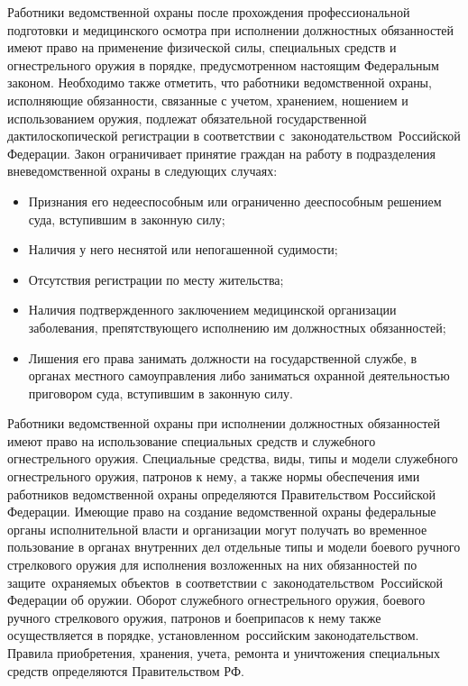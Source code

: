 \documentclass[a4paper,12pt,fleqn]{article} %
\begin{document}
Работники ведомственной охраны после прохождения профессиональной подготовки и медицинского осмотра при исполнении должностных обязанностей имеют право на применение физической силы, специальных средств и огнестрельного оружия в порядке, предусмотренном настоящим Федеральным законом. Необходимо также отметить, что работники ведомственной охраны, исполняющие обязанности, связанные с учетом, хранением, ношением и использованием оружия, подлежат обязательной государственной дактилоскопической регистрации в соответствии с законодательством Российской Федерации. Закон ограничивает принятие граждан на работу в подразделения вневедомственной охраны в следующих случаях:

\begin{itemize}
	\item Признания его недееспособным или ограниченно дееспособным решением суда, вступившим в законную силу;
	\item Наличия у него неснятой или непогашенной судимости;
	\item Отсутствия регистрации по месту жительства;
	\item Наличия подтвержденного заключением медицинской организации заболевания, препятствующего исполнению им должностных обязанностей;
	\item Лишения его права занимать должности на государственной службе, в органах местного самоуправления либо заниматься охранной деятельностью приговором суда, вступившим в законную силу.
\end{itemize}

Работники ведомственной охраны при исполнении должностных обязанностей имеют право на использование специальных средств и служебного огнестрельного оружия. Специальные средства, виды, типы и модели служебного огнестрельного оружия, патронов к нему, а также нормы обеспечения ими работников ведомственной охраны определяются Правительством Российской Федерации. Имеющие право на создание ведомственной охраны федеральные органы исполнительной власти и организации могут получать во временное пользование в органах внутренних дел отдельные типы и модели боевого ручного стрелкового оружия для исполнения возложенных на них обязанностей по защите охраняемых объектов в соответствии с законодательством Российской Федерации об оружии. Оборот служебного огнестрельного оружия, боевого ручного стрелкового оружия, патронов и боеприпасов к нему также осуществляется в порядке, установленном российским законодательством. Правила приобретения, хранения, учета, ремонта и уничтожения специальных средств определяются Правительством РФ.
\end{document}
